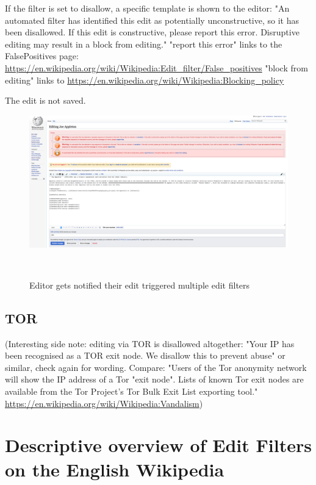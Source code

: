 \documentclass{sigchi}
\begin{document}
If the filter is set to disallow, a specific template is shown to the editor: "An automated filter has identified this edit as potentially unconstructive, so it has been disallowed. If this edit is constructive, please report this error. Disruptive editing may result in a block from editing."
"report this error" links to the FalsePositives page: \url{https://en.wikipedia.org/wiki/Wikipedia:Edit_filter/False_positives}
"block from editing" links to \url{https://en.wikipedia.org/wiki/Wikipedia:Blocking_policy}

The edit is not saved.

\begin{figure}
\centering
  \includegraphics[width=0.9\columnwidth]{figures/screenshots-filter-trigger/Screenshot-trigger-warning-filter.png}
  \caption{Editor gets notified their edit triggered multiple edit filters}~\label{fig:screenshot-warn-disallow}
\end{figure}

\subsection{TOR}
(Interesting side note: editing via TOR is disallowed altogether: "Your IP has been recognised as a TOR exit node. We disallow this to prevent abuse" or similar, check again for wording. Compare: "Users of the Tor anonymity network will show the IP address of a Tor "exit node". Lists of known Tor exit nodes are available from the Tor Project's Tor Bulk Exit List exporting tool." \url{https://en.wikipedia.org/wiki/Wikipedia:Vandalism})



\section{Descriptive overview of Edit Filters on the English Wikipedia}
\end{document}
